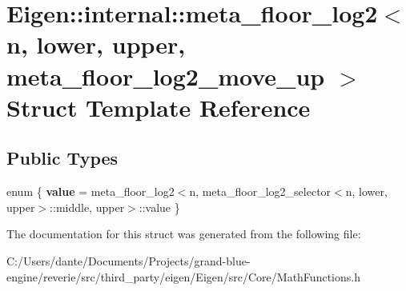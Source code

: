 \hypertarget{struct_eigen_1_1internal_1_1meta__floor__log2_3_01n_00_01lower_00_01upper_00_01meta__floor__log2__move__up_01_4}{}\section{Eigen\+::internal\+::meta\+\_\+floor\+\_\+log2$<$ n, lower, upper, meta\+\_\+floor\+\_\+log2\+\_\+move\+\_\+up $>$ Struct Template Reference}
\label{struct_eigen_1_1internal_1_1meta__floor__log2_3_01n_00_01lower_00_01upper_00_01meta__floor__log2__move__up_01_4}
\subsection*{Public Types}
\begin{DoxyCompactItemize}
\item 
\mbox{\label{struct_eigen_1_1internal_1_1meta__floor__log2_3_01n_00_01lower_00_01upper_00_01meta__floor__log2__move__up_01_4_aaf98a39b5d8849b9b6148074987cff14}} 
enum \{ {\bfseries value} = meta\+\_\+floor\+\_\+log2$<$n, meta\+\_\+floor\+\_\+log2\+\_\+selector$<$n, lower, upper$>$\+::middle, upper$>$\+::value
 \}
\end{DoxyCompactItemize}


The documentation for this struct was generated from the following file\+:\begin{DoxyCompactItemize}
\item 
C\+:/\+Users/dante/\+Documents/\+Projects/grand-\/blue-\/engine/reverie/src/third\+\_\+party/eigen/\+Eigen/src/\+Core/Math\+Functions.\+h\end{DoxyCompactItemize}
